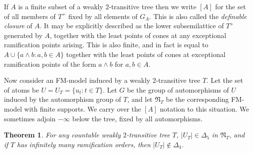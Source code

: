 \documentclass[a4paper,reqno]{amsart}
\numberwithin{equation}{section}
\newtheorem{theorem}{Theorem}[section]
\begin{document}
If $A$ is a finite subset of a weakly 2-transitive tree then we write $[A]$ for the set of all members of $T^+$ fixed
by all elements of $G_A$. This is also called the {\em definable closure} of $A$. It may be explicitly described as 
the lower subsemilattice of $T^+$ generated by $A$, together with the least points of cones at any exceptional 
ramification points arising. This is also finite, and in fact is equal to $A \cup \{a \wedge b: a, b \in A\}$ together with 
the least points of cones at exceptional ramification points of the form $a \wedge b$ for $a, b \in A$. 

Now consider an FM-model induced by a weakly 2-transitive tree $T$. Let the set of atoms be $U = U_T = \{u_t: t \in T\}$.
Let $G$ be the group of automorphisms of $U$ induced by the automorphism group of $T$, and let ${\mathfrak N}_T$ be 
the corresponding FM-model with finite supports. We carry over the $[A]$ notation to this situation. We sometimes 
adjoin $-\infty$ below the tree, fixed by all automorphisms.

\begin{theorem}  \label{3.1} For any countable weakly $2$-transitive tree $T$, $|U_T| \in \Delta_5$ in ${\mathfrak N}_T$, 
and if $T$ has infinitely many ramification orders, then $|U_T| \not \in \Delta_4$.   \end{theorem}
\end{document}
